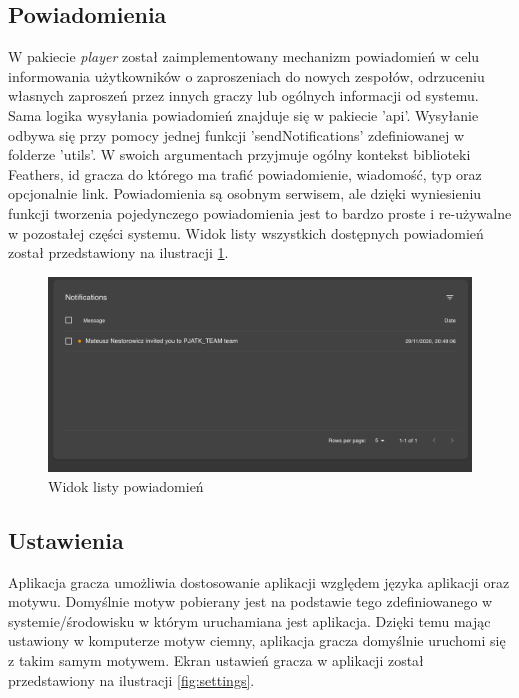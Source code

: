 \subsection{Powiadomienia}

W pakiecie \textit{player} został zaimplementowany mechanizm powiadomień w celu informowania użytkowników o zaproszeniach do nowych zespołów, odrzuceniu własnych zaproszeń przez innych graczy lub ogólnych informacji od systemu. Sama logika wysyłania powiadomień znajduje się w pakiecie 'api'. Wysyłanie odbywa się przy pomocy jednej funkcji 'sendNotifications' zdefiniowanej w folderze 'utils'. W swoich argumentach przyjmuje ogólny kontekst biblioteki Feathers, id gracza do którego ma trafić powiadomienie, wiadomość, typ oraz opcjonalnie link. Powiadomienia są osobnym serwisem, ale dzięki wyniesieniu funkcji tworzenia pojedynczego powiadomienia jest to bardzo proste i re-używalne w pozostałej części systemu. Widok listy wszystkich dostępnych powiadomień został przedstawiony na ilustracji \ref{fig:notifications}.

\begin{figure}[h!]
  \centering
    \includegraphics[width=\textwidth]{images/player/notifications.png}
  \caption{Widok listy powiadomień}
  \label{fig:notifications}
\end{figure}

\subsection{Ustawienia}

Aplikacja gracza umożliwia dostosowanie aplikacji względem języka aplikacji oraz motywu. Domyślnie motyw pobierany jest na podstawie tego zdefiniowanego w systemie/środowisku w którym uruchamiana jest aplikacja. Dzięki temu mając ustawiony w komputerze motyw ciemny, aplikacja gracza domyślnie uruchomi się z takim samym motywem. Ekran ustawień gracza w aplikacji został przedstawiony na ilustracji \ref{fig:settings}.

